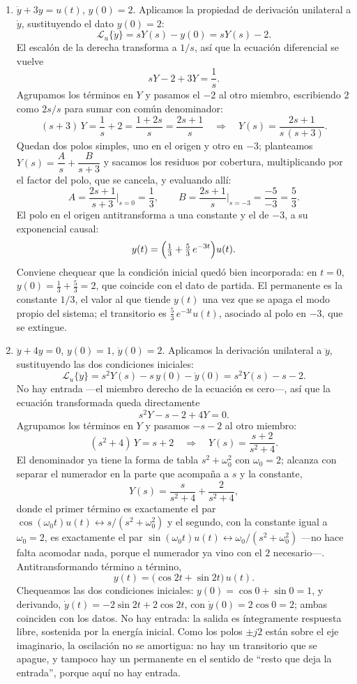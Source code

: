 \documentclass[10pt,a4paper]{article}
\begin{document}
\begin{enumerate}
	\item $\dot y+3y=u(t)$, $y(0)=2$. Aplicamos la propiedad de derivación
	unilateral a $\dot y$, sustituyendo el dato $y(0)=2$:
	\[
		\mathcal{L}_u\{\dot y\}=sY(s)-y(0)=sY(s)-2.
	\]
	El escalón de la derecha transforma a $1/s$, así que la ecuación
	diferencial se vuelve
	\[
		sY-2+3Y=\frac1s.
	\]
	Agrupamos los términos en $Y$ y pasamos el $-2$ al otro miembro, escribiendo
	$2$ como $2s/s$ para sumar con común denominador:
	\[
		(s+3)\,Y=\frac1s+2=\frac{1+2s}{s}=\frac{2s+1}{s}
		\quad\Longrightarrow\quad
		Y(s)=\frac{2s+1}{s\,(s+3)}.
	\]
	Quedan dos polos simples, uno en el origen y otro en $-3$; planteamos
	$Y(s)=\dfrac{A}{s}+\dfrac{B}{s+3}$ y sacamos los residuos por cobertura,
	multiplicando por el factor del polo, que se cancela, y evaluando allí:
	\[ 
		A=\frac{2s+1}{s+3}\bigg|_{s=0}=\frac{1}{3},
		\qquad
		B=\frac{2s+1}{s}\bigg|_{s=-3}=\frac{-5}{-3}=\frac{5}{3}.
	\]
	El polo en el origen antitransforma a una constante y el de $-3$, a su
	exponencial causal:
	\[
		y(t)=\Bigl(\tfrac13+\tfrac53\,e^{-3t}\Bigr)u(t).
	\]
	Conviene chequear que la condición inicial quedó bien incorporada: en
	$t=0$, $y(0)=\tfrac13+\tfrac53=2$, que coincide con el dato de partida. El
	permanente es la constante $1/3$, el valor al que tiende $y(t)$ una vez
	que se apaga el modo propio del sistema; el transitorio es
	$\tfrac53\,e^{-3t}u(t)$, asociado al polo en $-3$, que se extingue.

	\item $\ddot y+4y=0$, $y(0)=1$, $\dot y(0)=2$. Aplicamos la derivación
	unilateral a $\ddot y$, sustituyendo las dos condiciones iniciales:
	\[
		\mathcal{L}_u\{\ddot y\}=s^2Y(s)-s\,y(0)-\dot y(0)=s^2Y(s)-s-2.
	\]
	No hay entrada ---el miembro derecho de la ecuación es cero---, así que la
	ecuación transformada queda directamente
	\[
		s^2Y-s-2+4Y=0.
	\]
	Agrupamos los términos en $Y$ y pasamos $-s-2$ al otro miembro:
	\[
		(s^2+4)\,Y=s+2
		\quad\Longrightarrow\quad
		Y(s)=\frac{s+2}{s^2+4}.
	\]
	El denominador ya tiene la forma de tabla $s^2+\omega_0^2$ con
	$\omega_0=2$; alcanza con separar el numerador en la parte que acompaña a
	$s$ y la constante,
	\[
		Y(s)=\frac{s}{s^2+4}+\frac{2}{s^2+4},
	\]
	donde el primer término es exactamente el par
	$\cos(\omega_0 t)u(t)\leftrightarrow s/(s^2+\omega_0^2)$ y el segundo,
	con la constante igual a $\omega_0=2$, es exactamente el par
	$\sin(\omega_0 t)u(t)\leftrightarrow \omega_0/(s^2+\omega_0^2)$ ---no hace
	falta acomodar nada, porque el numerador ya vino con el $2$ necesario---.
	Antitransformando término a término,
	\[
		y(t)=\bigl(\cos 2t+\sin 2t\bigr)\,u(t).
	\]
	Chequeamos las dos condiciones iniciales: $y(0)=\cos 0+\sin 0=1$, y
	derivando, $\dot y(t)=-2\sin 2t+2\cos 2t$, con $\dot y(0)=2\cos 0=2$;
	ambas coinciden con los datos. No hay entrada: la salida es íntegramente
	respuesta libre, sostenida por la energía inicial. Como los polos $\pm j2$
	están sobre el eje imaginario, la oscilación no se amortigua: no hay un
	transitorio que se apague, y tampoco hay un permanente en el sentido de
	``resto que deja la entrada'', porque aquí no hay entrada.


\end{enumerate}
\end{document}
